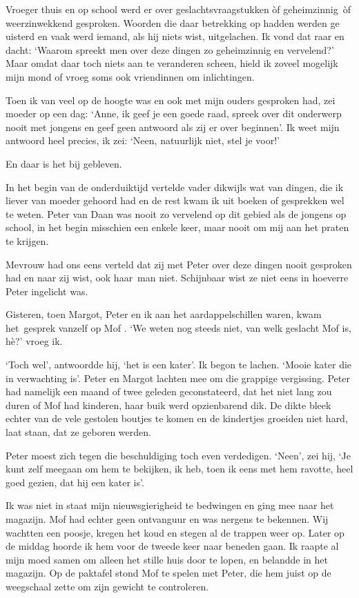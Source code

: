 \documentclass{book}
\begin{document}
Vroeger thuis en op school werd er over geslachtsvraagstukken òf
geheimzinnig~òf weerzinwekkend gesproken. Woorden die daar betrekking op
hadden werden ge uisterd en vaak werd iemand, als hij niets wist,
uitgelachen. Ik vond dat raar en dacht: `Waarom spreekt men over deze
dingen zo geheimzinnig en vervelend?' Maar omdat daar toch niets aan te
veranderen scheen, hield ik zoveel mogelijk mijn mond of vroeg soms ook
vriendinnen om inlichtingen.

Toen ik van veel op de hoogte was en ook met mijn ouders gesproken had,
zei moeder op een dag: `Anne, ik geef je een goede raad, spreek over dit
onderwerp nooit met jongens en geef geen antwoord als zij er over
beginnen'. Ik weet mijn antwoord heel precies, ik zei: `Neen, natuurlijk
niet, stel je voor!'

En daar is het bij gebleven.

In het begin van de onderduiktijd vertelde vader dikwijls wat van
dingen, die ik liever van moeder gehoord had en de rest kwam ik uit
boeken of gesprekken wel te weten. Peter van Daan was nooit zo vervelend
op dit gebied als de jongens op school, in het begin misschien een
enkele keer, maar nooit om mij aan het praten te krijgen.

Mevrouw had ons eens verteld dat zij met Peter over deze dingen nooit
gesproken had en naar zij wist, ook haar~man niet. Schijnbaar wist ze
niet eens in hoeverre Peter ingelicht was.

Gisteren, toen Margot, Peter en ik aan het aardappelschillen waren, kwam
het~gesprek vanzelf op Mof . `We weten nog steeds niet, van welk
geslacht Mof is, hè?' vroeg ik.

`Toch wel', antwoordde hij, `het is een kater'. Ik begon te lachen.
`Mooie kater die in verwachting is'. Peter en Margot lachten mee om die
grappige vergissing. Peter had namelijk een maand of twee geleden
geconstateerd, dat het niet lang zou duren of Mof had kinderen, haar
buik werd opzienbarend dik. De dikte bleek echter van de vele gestolen
boutjes te komen en de kindertjes groeiden niet hard, laat staan, dat ze
geboren werden.

Peter moest zich tegen die beschuldiging toch even verdedigen. `Neen',
zei hij, `Je kunt zelf meegaan om hem te bekijken, ik heb, toen ik eens
met hem ravotte, heel goed gezien, dat hij een kater is'.

Ik was niet in staat mijn nieuwsgierigheid te bedwingen en ging mee naar
het magazijn. Mof had echter geen ontvanguur en was nergens te bekennen.
Wij wachtten een poosje, kregen het koud en stegen al de trappen weer
op. Later op de middag hoorde ik hem voor de tweede keer naar beneden
gaan. Ik raapte al mijn moed samen om alleen het stille huis door te
lopen, en belandde in het magazijn. Op de paktafel stond Mof te spelen
met Peter, die hem juist op de weegschaal zette om zijn gewicht te
controleren.
\end{document}
